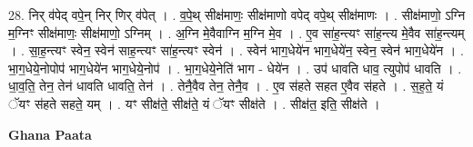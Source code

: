 \documentclass[17pt]{extarticle}
\begin{document}
28. निर् व॑पेद् वपे॒न् निर् णिर् व॑पेत् । . व॒पे॒थ् सीक्ष॑माणः॒ सीक्ष॑माणो वपेद् वपे॒थ् सीक्ष॑माणः । . सीक्ष॑माणो॒ ऽग्नि म॒ग्निꣳ सीक्ष॑माणः॒ सीक्ष॑माणो॒ ऽग्निम् । . अ॒ग्नि मे॒वैवाग्नि म॒ग्नि मे॒व । . ए॒व सा॑ह॒न्त्यꣳ सा॑ह॒न्त्य मे॒वैव सा॑ह॒न्त्यम् । . सा॒ह॒न्त्यꣳ स्वेन॒ स्वेन॑ साह॒न्त्यꣳ सा॑ह॒न्त्यꣳ स्वेन॑ । . स्वेन॑ भाग॒धेये॑न भाग॒धेये॑न॒ स्वेन॒ स्वेन॑ भाग॒धेये॑न । . भा॒ग॒धेये॒नोपोप॑ भाग॒धेये॑न भाग॒धेये॒नोप॑ । . भा॒ग॒धेये॒नेति॑ भाग - धेये॑न । . उप॑ धावति धाव॒ त्युपोप॑ धावति । . धा॒व॒ति॒ तेन॒ तेन॑ धावति धावति॒ तेन॑ । . तेनै॒वैव तेन॒ तेनै॒व । . ए॒व स॑हते सहत ए॒वैव स॑हते । . स॒ह॒ते॒ यं ॅयꣳ स॑हते सहते॒ यम् । . यꣳ सीक्ष॑ते॒ सीक्ष॑ते॒ यं ॅयꣳ सीक्ष॑ते । . सीक्ष॑त॒ इति॒ सीक्ष॑ते । \newline

\textbf{Ghana Paata } \newline
\end{document}
